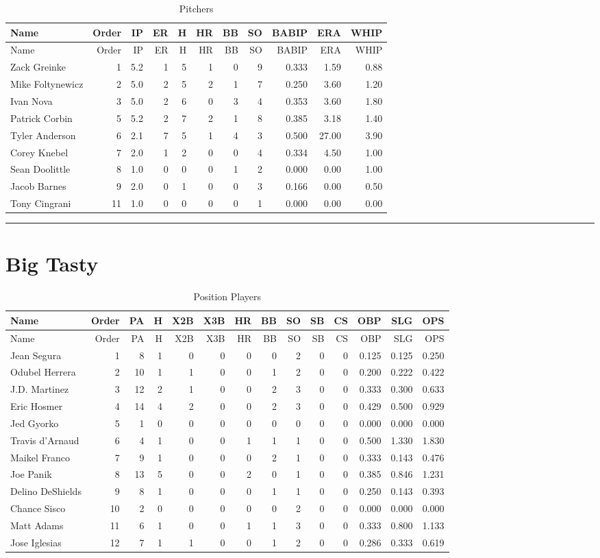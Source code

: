 \documentclass[]{article}
\begin{document}
\begin{longtable}[]{@{}lrrrrrrrrrr@{}}
\caption{Pitchers}\tabularnewline
\toprule
Name & Order & IP & ER & H & HR & BB & SO & BABIP & ERA &
WHIP\tabularnewline
\midrule
\endfirsthead
\toprule
Name & Order & IP & ER & H & HR & BB & SO & BABIP & ERA &
WHIP\tabularnewline
\midrule
\endhead
Zack Greinke & 1 & 5.2 & 1 & 5 & 1 & 0 & 9 & 0.333 & 1.59 &
0.88\tabularnewline
Mike Foltynewicz & 2 & 5.0 & 2 & 5 & 2 & 1 & 7 & 0.250 & 3.60 &
1.20\tabularnewline
Ivan Nova & 3 & 5.0 & 2 & 6 & 0 & 3 & 4 & 0.353 & 3.60 &
1.80\tabularnewline
Patrick Corbin & 5 & 5.2 & 2 & 7 & 2 & 1 & 8 & 0.385 & 3.18 &
1.40\tabularnewline
Tyler Anderson & 6 & 2.1 & 7 & 5 & 1 & 4 & 3 & 0.500 & 27.00 &
3.90\tabularnewline
Corey Knebel & 7 & 2.0 & 1 & 2 & 0 & 0 & 4 & 0.334 & 4.50 &
1.00\tabularnewline
Sean Doolittle & 8 & 1.0 & 0 & 0 & 0 & 1 & 2 & 0.000 & 0.00 &
1.00\tabularnewline
Jacob Barnes & 9 & 2.0 & 0 & 1 & 0 & 0 & 3 & 0.166 & 0.00 &
0.50\tabularnewline
Tony Cingrani & 11 & 1.0 & 0 & 0 & 0 & 0 & 1 & 0.000 & 0.00 &
0.00\tabularnewline
\bottomrule
\end{longtable}

\begin{center}\rule{0.5\linewidth}{\linethickness}\end{center}

\section{Big Tasty}\label{big-tasty}

\begin{longtable}[]{@{}lrrrrrrrrrrrrr@{}}
\caption{Position Players}\tabularnewline
\toprule
Name & Order & PA & H & X2B & X3B & HR & BB & SO & SB & CS & OBP & SLG &
OPS\tabularnewline
\midrule
\endfirsthead
\toprule
Name & Order & PA & H & X2B & X3B & HR & BB & SO & SB & CS & OBP & SLG &
OPS\tabularnewline
\midrule
\endhead
Jean Segura & 1 & 8 & 1 & 0 & 0 & 0 & 0 & 2 & 0 & 0 & 0.125 & 0.125 &
0.250\tabularnewline
Odubel Herrera & 2 & 10 & 1 & 1 & 0 & 0 & 1 & 2 & 0 & 0 & 0.200 & 0.222
& 0.422\tabularnewline
J.D. Martinez & 3 & 12 & 2 & 1 & 0 & 0 & 2 & 3 & 0 & 0 & 0.333 & 0.300 &
0.633\tabularnewline
Eric Hosmer & 4 & 14 & 4 & 2 & 0 & 0 & 2 & 3 & 0 & 0 & 0.429 & 0.500 &
0.929\tabularnewline
Jed Gyorko & 5 & 1 & 0 & 0 & 0 & 0 & 0 & 0 & 0 & 0 & 0.000 & 0.000 &
0.000\tabularnewline
Travis d'Arnaud & 6 & 4 & 1 & 0 & 0 & 1 & 1 & 1 & 0 & 0 & 0.500 & 1.330
& 1.830\tabularnewline
Maikel Franco & 7 & 9 & 1 & 0 & 0 & 0 & 2 & 1 & 0 & 0 & 0.333 & 0.143 &
0.476\tabularnewline
Joe Panik & 8 & 13 & 5 & 0 & 0 & 2 & 0 & 1 & 0 & 0 & 0.385 & 0.846 &
1.231\tabularnewline
Delino DeShields & 9 & 8 & 1 & 0 & 0 & 0 & 1 & 1 & 0 & 0 & 0.250 & 0.143
& 0.393\tabularnewline
Chance Sisco & 10 & 2 & 0 & 0 & 0 & 0 & 0 & 2 & 0 & 0 & 0.000 & 0.000 &
0.000\tabularnewline
Matt Adams & 11 & 6 & 1 & 0 & 0 & 1 & 1 & 3 & 0 & 0 & 0.333 & 0.800 &
1.133\tabularnewline
Jose Iglesias & 12 & 7 & 1 & 1 & 0 & 0 & 1 & 2 & 0 & 0 & 0.286 & 0.333 &
0.619\tabularnewline
\bottomrule
\end{longtable}
\end{document}
